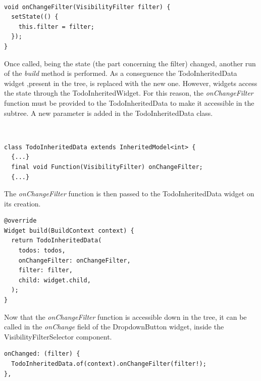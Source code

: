 \mbox{}\\


 \mbox{}

\begin{verbatim}
void onChangeFilter(VisibilityFilter filter) {
  setState(() {
    this.filter = filter;
  });
}
\end{verbatim}

Once called, being the state (the part concerning the filter) changed, another run of the \textit{build} method is performed. As a conseguence the TodoInheritedData widget ,present in the tree, is replaced with the new one.
However, widgets access the state through the TodoInheritedWidget. For this reason,
the \textit{onChangeFilter   }function must be provided to the TodoInheritedData to make it accessible in the subtree. A new parameter is added in the TodoInheritedData class.


\mbox{}\\

\begin{verbatim}
class TodoInheritedData extends InheritedModel<int> {
  {...}
  final void Function(VisibilityFilter) onChangeFilter;
  {...}
\end{verbatim}

The \textit{onChangeFilter} function is then passed to the TodoInheritedData widget on its creation.
 

\begin{verbatim}
@override
Widget build(BuildContext context) {
  return TodoInheritedData(
    todos: todos,
    onChangeFilter: onChangeFilter,
    filter: filter,
    child: widget.child,
  );
}

\end{verbatim}
 
Now that the \textit{onChangeFilter   }function is accessible down in the tree, it can be called in the \textit{onChange }field of the DropdownButton widget, inside the VisibilityFilterSelector component.
\mbox{}\\



\begin{verbatim}
onChanged: (filter) {
  TodoInheritedData.of(context).onChangeFilter(filter!);
},
\end{verbatim}

